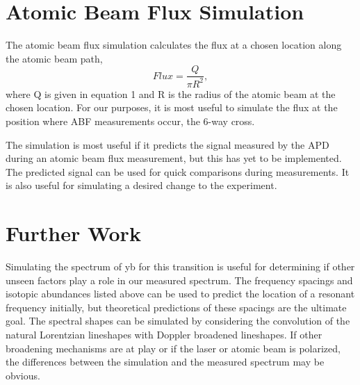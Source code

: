 \documentclass[12pt, a4paper]{article}
\begin{document}
\section{Atomic Beam Flux Simulation}
The atomic beam flux simulation calculates the flux at a chosen location along the atomic beam path,
\begin{equation}
Flux = \frac{Q}{\pi R^{2}},
\end{equation}
where Q is given in equation 1 and R is the radius of the atomic beam at the chosen location. For our purposes, it is most useful to simulate the flux at the position where ABF measurements occur, the 6-way cross. 

The simulation is most useful if it predicts the signal measured by the APD during an atomic beam flux measurement, but this has yet to be implemented. The predicted signal can be used for quick comparisons during measurements. It is also useful for simulating a desired change to the experiment. 


\section{Further Work}
Simulating the spectrum of yb for this transition is useful for determining if other unseen factors play a role in our measured spectrum. The frequency spacings and isotopic abundances listed above can be used to predict the location of a resonant frequency initially, but theoretical predictions of these spacings are the ultimate goal. The spectral shapes can be simulated by considering the convolution of the natural Lorentzian lineshapes with Doppler broadened lineshapes. If other broadening mechanisms are at play or if the laser or atomic beam is polarized, the differences between the simulation and the measured spectrum may be obvious. 



\nocite{*}
{}

\end{document}
